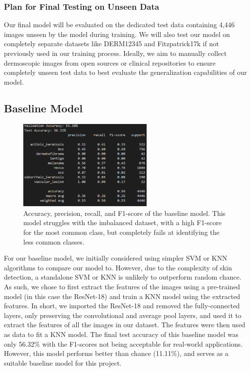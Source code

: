 \documentclass{article} %
\begin{document}
\subsubsection{Plan for Final Testing on Unseen Data}

Our final model will be evaluated on the dedicated test data containing 4,446 images unseen by the model during training. We will also test our model on completely separate datasets like DERM12345 and Fitzpatrick17k if not previously used in our training process. Ideally, we aim to manually collect dermoscopic images from open sources or clinical repositories to ensure completely unseen test data to best evaluate the generalization capabilities of our model.

\subsection{Baseline Model}

\begin{figure}[H]
\begin{center}
\includegraphics[width=0.6\textwidth]{Figs/baseline_performance.png}
\end{center}
\caption{Accuracy, precision, recall, and F1-score of the baseline model. This model struggles with the imbalanced dataset, with a high F1-score for the most common class, but completely fails at identifying the less common classes.}
\end{figure}


For our baseline model, we initially considered using simpler SVM or KNN algorithms to compare our model to. However, due to the complexity of skin detection, a standalone SVM or KNN is unlikely to outperform random chance. As such, we chose to first extract the features of the images using a pre-trained model (in this case the ResNet-18) and train a KNN model using the extracted features. In short, we imported the ResNet-18 and removed the fully-connected layers, only preserving the convolutional and average pool layers, and used it to extract the features of all the images in our dataset. The features were then used as data to fit a KNN model. The final test accuracy of this baseline model was only 56.32\% with the F1-scores not being acceptable for real-world applications. However, this model performs better than chance (11.11\%), and serves as a suitable baseline model for this project.
\end{document}
